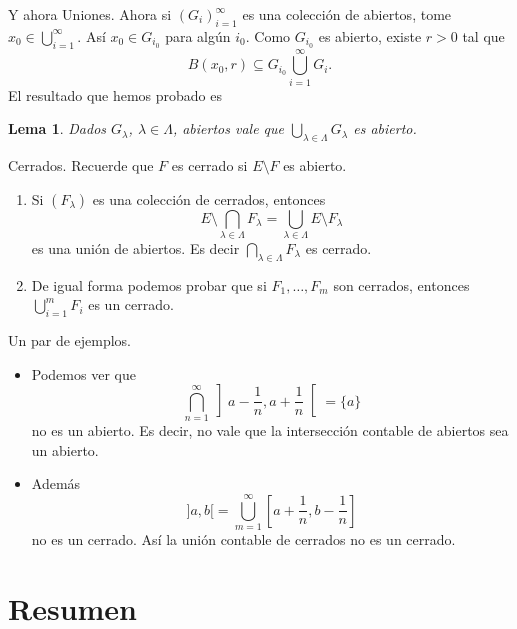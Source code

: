 \documentclass[utf8]{beamer}
\theoremstyle{plain}
\newtheorem{Lem}{Lema}                 %
\theoremstyle{definition}
\theoremstyle{remark}
\numberwithin{equation}{section}
\begin{document}
\begin{frame}{Y ahora Uniones.}
  Ahora si $(G_i)_{i=1}^\infty$ es una colecci\'on de abiertos, tome $x_0\in \bigcup_{i=1}^\infty$. As\'i $x_0\in G_{i_0}$ para alg\'un $i_0$. Como $G_{i_0}$ es abierto, existe $r>0$ tal que 
  $$B(x_0,r)\subseteq G_{i_0}\bigcup_{i=1}^\infty G_i.$$
  El resultado que hemos probado es
  \begin{Lem}
    Dados $G_\lambda$, $\lambda\in\Lambda$, abiertos vale que $\bigcup_{\lambda\in\Lambda}G_\lambda$ es abierto.
  \end{Lem}
\end{frame}

\begin{frame}{Cerrados.}
  Recuerde que $F$ es \alert{cerrado} si $E\setminus F$ es abierto.
  \begin{enumerate}
    \item Si $(F_\lambda)$ es una colecci\'on de cerrados, entonces 
     $$E\setminus \bigcap_{\lambda\in\Lambda}F_\lambda=\bigcup_{\lambda\in\Lambda} E\setminus F_\lambda$$
     es una uni\'on de abiertos. Es decir $\bigcap_{\lambda\in\Lambda}F_\lambda$ es cerrado.
     \item De igual forma podemos probar que si $F_1,\dots, F_m$ son cerrados, entonces $\bigcup_{i=1}^mF_i$ es un cerrado.
  \end{enumerate}
\end{frame}

\begin{frame}{Un par de ejemplos.}
  
  \begin{itemize}
    \item Podemos ver que
    $$\bigcap_{n=1}^\infty \left]a-\frac1n,a+\frac1n\right[=\{ a\}$$
    no es un abierto. Es decir, no vale que la intersecci\'on contable de abiertos sea un abierto.
    \item Adem\'as 
    $$]a,b[=\bigcup_{m=1}^\infty \left[a+\frac1n,b-\frac1n\right]$$
    no es un cerrado. As\'i la uni\'on contable de cerrados no es un cerrado.
  \end{itemize}
\end{frame}

\section*{Resumen}
\end{document}
